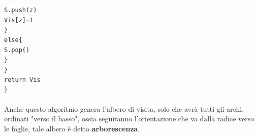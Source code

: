 \documentclass[12pt, letterpaper]{article}
\newcommand{\codee}[1]{\colorbox{white}{\texttt{#1}}}
\newcommand{\acc}{\\\hphantom{}\\}
\begin{document}
\hphantom{ident}\hphantom{ident}\hphantom{ident}\codee{S.push(z)}\\
\hphantom{ident}\hphantom{ident}\hphantom{ident}\codee{Vis[z]=1}\\
\hphantom{ident}\hphantom{ident}\codee{\}}\\
\hphantom{ident}\hphantom{ident}\codee{else\{}\\
\hphantom{ident}\hphantom{ident}\hphantom{ident}\codee{S.pop()}\\
\hphantom{ident}\hphantom{ident}\codee{\}}\\
\hphantom{ident}\codee{\}}\\
\hphantom{ident}\codee{return Vis}\\
\codee{\}}\acc
Anche questo algoritmo genera l'albero di visita, solo che avrà tutti gli archi, ordinati "verso il basso", ossia
seguiranno l'orientazione che va dalla radice verso le foglie, tale albero è detto \textbf{arborescenza}.
\end{document}
